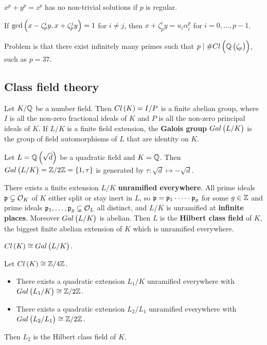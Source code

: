 \begin{theorem}[Kummer]
$ x^p + y^p = z^p $ has no non-trivial solutions if $ p $ is regular.
\end{theorem}

\begin{example*}
If $ \gcd\br{x - \zeta_p^iy, x + \zeta_p^jy} = 1 $ for $ i \ne j $, then $ x + \zeta_p^iy = u_i\alpha_i^p $ for $ i = 0, \dots, p - 1 $.
\end{example*}

Problem is that there exist infinitely many primes such that $ p \mid \#Cl\br{\Q\br{\zeta_p}} $, such as $ p = 37 $.

\subsection{Class field theory}

Let $ K / \mathbb{Q} $ be a number field. Then $ Cl\br{K} = I / P $ is a finite abelian group, where $ I $ is all the non-zero fractional ideals of $ K $ and $ P $ is all the non-zero principal ideals of $ K $. If $ L / K $ is a finite field extension, the \textbf{Galois group} $ Gal\br{L / K} $ is the group of field automorphisms of $ L $ that are identity on $ K $.

\begin{example*}
Let $ L = \Q\br{\sqrt{d}} $ be a quadratic field and $ K = \mathbb{Q} $. Then $ Gal\br{L / K} = \Z / 2\Z = \cbr{1, \tau} $ is generated by $ \tau : \sqrt{d} \mapsto -\sqrt{d} $.
\end{example*}

There exists a finite extension $ L / K $ \textbf{unramified everywhere}. All prime ideals $ \mathfrak{p} \subsetneq \mathcal{O}_K $ of $ K $ either split or stay inert in $ L $, so $ \mathfrak{p} = \mathfrak{p}_1 \cdot \dots \cdot \mathfrak{p}_g $ for some $ g \in \mathbb{Z} $ and prime ideals $ \mathfrak{p}_1, \dots, \mathfrak{p}_g \subsetneq \mathcal{O}_L $ all distinct, and $ L / K $ is unramified at \textbf{infinite places}. Moreover $ Gal\br{L / K} $ is abelian. Then $ L $ is the \textbf{Hilbert class field} of $ K $, the biggest finite abelian extension of $ K $ which is unramified everywhere.

\begin{theorem}
$ Cl\br{K} \cong Gal\br{L / K} $.
\end{theorem}

\begin{example*}
Let $ Cl\br{K} \cong \Z / 4\Z $.
\begin{itemize}
\item There exists a quadratic extension $ L_1 / K $ unramified everywhere with $ Gal\br{L_1 / K} \cong \Z / 2\Z $.
\item There exists a quadratic extension $ L_2 / L_1 $ unramified everywhere with $ Gal\br{L_2 / L_1} \cong \Z / 2\Z $.
\end{itemize}
Then $ L_2 $ is the Hilbert class field of $ K $.
\end{example*}

